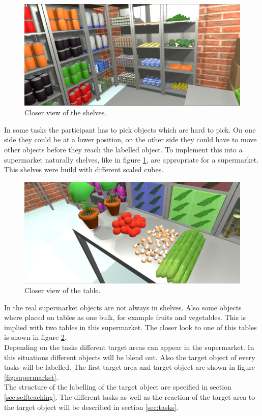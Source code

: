 \begin{figure}[H] 
	\center 
	\includegraphics[width=12cm]{Images/supermarket2.PNG}
	\caption[Closer view of the shelves.]{Closer view of the shelves.}
	\label{fig:shelve}
\end{figure}

In some tasks the participant has to pick objects which are hard to pick. On one side they could be at a lower position, on the other side they could have to move other objects before they reach the labelled object. To implement this into a supermarket naturally shelves, like in figure \ref{fig:shelve}, are appropriate for a supermarket. This shelves were build with different scaled cubes.

\begin{figure}[H] 
	\center 
	\includegraphics[width=12cm]{Images/supermarket1.PNG}
	\caption[Closer view of the table.]{Closer view of the table.}
	\label{fig:table}
\end{figure}	

In the real supermarket objects are not always in shelves. Also some objects where placed on tables as one bulk, for example fruits and vegetables. This is implied with two tables in this supermarket. The closer look to one of this tables is shown in figure \ref{fig:table}.\\
Depending on the tasks different target areas can appear in the supermarket. In this situations different objects will be blend out. Also the target object of every tasks will be labelled. The first target area and target object are shown in figure \ref{fig:supermarket}.\\
 The structure of the labelling of the target object are specified in section \ref{sec:selfteaching}.
The different tasks as well as the reaction of the target area to the target object will be described in section \ref{sec:tasks}. %

